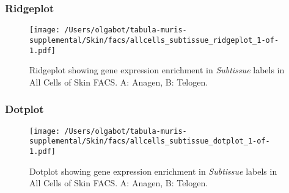 \clearpage

\subsubsection{Ridgeplot}
\begin{figure}[h]
\centering
\texttt{[image: /Users/olgabot/tabula-muris-supplemental/Skin/facs/allcells\_subtissue\_ridgeplot\_1-of-1.pdf]}

\caption{ Ridgeplot  showing gene expression enrichment in \emph{Subtissue} labels in All Cells of Skin FACS. A: Anagen, B: Telogen.}
\end{figure}


\clearpage

\subsubsection{Dotplot}
\begin{figure}[h]
\centering
\texttt{[image: /Users/olgabot/tabula-muris-supplemental/Skin/facs/allcells\_subtissue\_dotplot\_1-of-1.pdf]}

\caption{ Dotplot  showing gene expression enrichment in \emph{Subtissue} labels in All Cells of Skin FACS. A: Anagen, B: Telogen.}
\end{figure}

